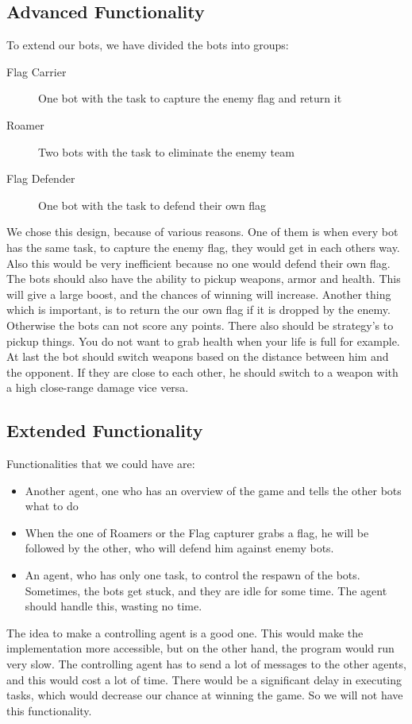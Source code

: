 \subsection{Advanced Functionality}
To extend our bots, we have divided the bots into groups:
\begin{description}
	\item[Flag Carrier] One bot with the task to capture the enemy flag and return it
	\item[Roamer] Two bots with the task to eliminate the enemy team
	\item[Flag Defender] One bot with the task to defend their own flag 
\end{description}
We chose this design, because of various reasons. One of them is when every bot has the same task, to capture the enemy flag, they would get in each others way. Also this would be very inefficient because no one would defend their own flag. The bots should also have the ability to pickup weapons, armor and health. This will give a large boost, and the chances of winning will increase. Another thing which is important, is to return the our own flag if it is dropped by the enemy. Otherwise the bots can not score any points. There also should be strategy's to pickup things. You do not want to grab health when your life is full for example. At last the bot should switch weapons based on the distance between him and the opponent. If they are close to each other, he should switch to a weapon with a high close-range damage vice versa.\\

\subsection{Extended Functionality}
Functionalities that we could have are:
\begin{itemize}
	\item Another agent, one who has an overview of the game and tells the other bots what to do
	\item When the one of Roamers or the Flag capturer grabs a flag, he will be followed by the other, who will defend him against enemy bots.
	\item An agent, who has only one task, to control the respawn of the bots. Sometimes, the bots get stuck, and they are idle for some time. The agent should handle this, wasting no time.
\end{itemize}
The idea to make a controlling agent is a good one. This would make the implementation more accessible, but on the other hand, the program would run very slow. The controlling agent has to send a lot of messages to the other agents, and this would cost a lot of time. There would be a significant delay in executing tasks, which would decrease our chance at winning the game. So we will not have this functionality.\\


